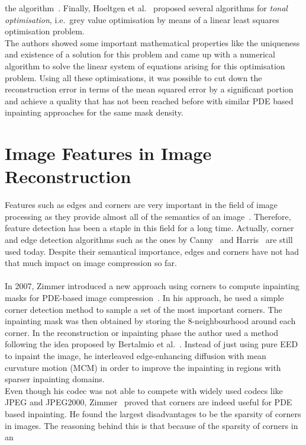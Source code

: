 the algorithm~\cite{hoeltgen12}.
Finally, Hoeltgen et al.~\cite{hoeltgen12} proposed several algorithms for \textit{tonal optimisation}, i.e.\ grey value
optimisation by means of a linear least squares optimisation problem. \\
The authors showed some important mathematical properties like the uniqueness and existence of a 
solution for this problem and came up with a numerical algorithm to solve the linear system of 
equations arising for this optimisation problem.
Using all these optimisations, it was possible to cut down the reconstruction error in terms of the
mean squared error by a significant portion and achieve a quality that has not been reached before 
with similar PDE based inpainting approaches for the same mask density.

\section{Image Features in Image Reconstruction}
Features such as edges and corners are very important in the field of image processing as they
provide almost all of the semantics of an image~\cite{marr82}. Therefore, feature detection has been a staple in
this field for a long time. Actually, corner and edge detection algorithms such as the ones by
Canny~\cite{canny86} and Harris~\cite{harris88} are still used today. 
Despite their semantical importance, edges and corners have not had that much impact on image
compression so far.\\
\\
In 2007, Zimmer introduced a new approach using corners to compute inpainting masks for
PDE-based image compression~\cite{zimmer07}. In his approach, he used a simple corner detection method to
sample a set of the most important corners. The inpainting mask was then obtained by storing the
8-neighbourhood around each corner. In the reconstruction or inpainting phase the author used a method
following the idea proposed by Bertalmio et al.~\cite{bertalmio00}. Instead of just using pure EED to
inpaint the image, he interleaved edge-enhancing diffusion with mean curvature motion (MCM) in order to
improve the inpainting in regions with sparser inpainting domains. \\
Even though his codec was not able to compete with widely used codecs like JPEG and JPEG2000, 
Zimmer~\cite{zimmer07} proved that corners are indeed useful for PDE based inpainting. 
He found the largest disadvantages to be the sparsity of corners in images. 
The reasoning behind this is that because of the sparsity of corners in an

